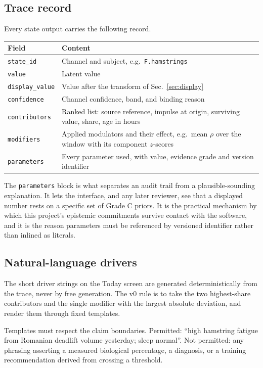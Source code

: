 \documentclass[11pt]{article}
\begin{document}
\subsection{Trace record}

Every state output carries the following record.

\begin{center}
\begin{tabular}{lp{}}
\toprule
Field & Content \\
\midrule
\texttt{state\_id} & Channel and subject, e.g.\ \texttt{F.hamstrings} \\
\texttt{value} & Latent value \\
\texttt{display\_value} & Value after the transform of Sec.~\ref{sec:display} \\
\texttt{confidence} & Channel confidence, band, and binding reason \\
\texttt{contributors} & Ranked list: source reference, impulse at origin, surviving value, share, age in hours \\
\texttt{modifiers} & Applied modulators and their effect, e.g.\ mean $\rho$ over the window with its component $z$-scores \\
\texttt{parameters} & Every parameter used, with value, evidence grade and version identifier \\
\bottomrule
\end{tabular}
\end{center}

The \texttt{parameters} block is what separates an audit trail from a plausible-sounding explanation. It lets the interface, and any later reviewer, see that a displayed number rests on a specific set of Grade C priors. It is the practical mechanism by which this project's epistemic commitments survive contact with the software, and it is the reason parameters must be referenced by versioned identifier rather than inlined as literals.

\subsection{Natural-language drivers}

The short driver strings on the Today screen are generated deterministically from the trace, never by free generation. The v0 rule is to take the two highest-share contributors and the single modifier with the largest absolute deviation, and render them through fixed templates.

Templates must respect the claim boundaries. Permitted: ``high hamstring fatigue from Romanian deadlift volume yesterday; sleep normal''. Not permitted: any phrasing asserting a measured biological percentage, a diagnosis, or a training recommendation derived from crossing a threshold.
\end{document}
